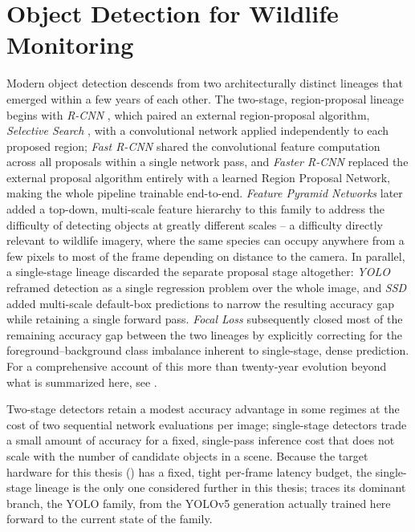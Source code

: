 \section{Object Detection for Wildlife Monitoring}\label{sec:lit_object_detection}

Modern object detection descends from two architecturally distinct lineages that emerged within a few years of each other. The two-stage, region-proposal lineage begins with \textit{R-CNN} \cite{girshickRichFeatureHierarchies2014a}, which paired an external region-proposal algorithm, \textit{Selective Search} \cite{uijlingsSelectiveSearchObject2013}, with a convolutional network applied independently to each proposed region; \textit{Fast R-CNN} \cite{girshickFastRCNN2015a} shared the convolutional feature computation across all proposals within a single network pass, and \textit{Faster R-CNN} \cite{renFasterRCNNRealTime2017} replaced the external proposal algorithm entirely with a learned Region Proposal Network, making the whole pipeline trainable end-to-end. \textit{Feature Pyramid Networks} \cite{linFeaturePyramidNetworks2017} later added a top-down, multi-scale feature hierarchy to this family to address the difficulty of detecting objects at greatly different scales -- a difficulty directly relevant to wildlife imagery, where the same species can occupy anywhere from a few pixels to most of the frame depending on distance to the camera. In parallel, a single-stage lineage discarded the separate proposal stage altogether: \textit{YOLO} \cite{redmonYouOnlyLook2016a} reframed detection as a single regression problem over the whole image, and \textit{SSD} \cite{liuSSDSingleShot2016a} added multi-scale default-box predictions to narrow the resulting accuracy gap while retaining a single forward pass. \textit{Focal Loss} \cite{linFocalLossDense2017} subsequently closed most of the remaining accuracy gap between the two lineages by explicitly correcting for the foreground--background class imbalance inherent to single-stage, dense prediction. For a comprehensive account of this more than twenty-year evolution beyond what is summarized here, see \cite{zouObjectDetection202023}.

Two-stage detectors retain a modest accuracy advantage in some regimes at the cost of two sequential network evaluations per image; single-stage detectors trade a small amount of accuracy for a fixed, single-pass inference cost that does not scale with the number of candidate objects in a scene. Because the target hardware for this thesis () has a fixed, tight per-frame latency budget, the single-stage lineage is the only one considered further in this thesis;  traces its dominant branch, the YOLO family, from the YOLOv5 generation actually trained here forward to the current state of the family.

